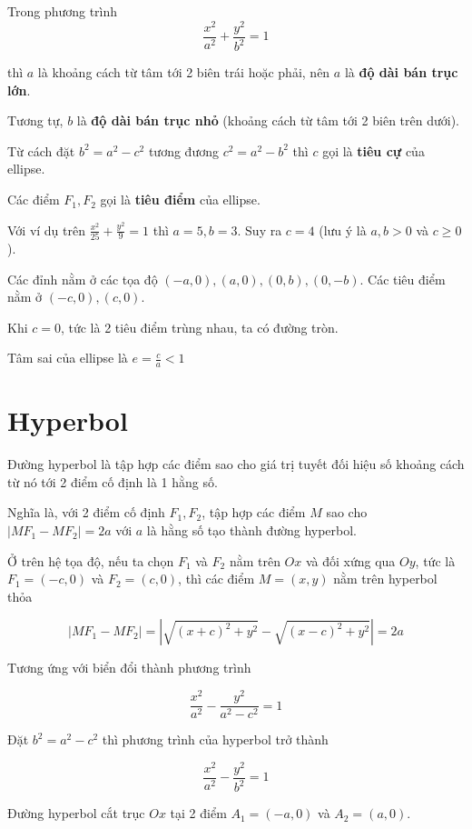 Trong phương trình $$\frac{x^2}{a^2} + \frac{y^2}{b^2} = 1$$

thì $a$ là khoảng cách từ tâm tới 2 biên trái hoặc phải, nên $a$ là \textbf{độ dài bán trục lớn}.

Tương tự, $b$ là \textbf{độ dài bán trục nhỏ} (khoảng cách từ tâm tới 2 biên trên dưới).

Từ cách đặt $b^2 = a^2 - c^2$ tương đương $c^2 = a^2 - b^2$ thì $c$ gọi là \textbf{tiêu cự} của ellipse.

Các điểm $F_1, F_2$ gọi là \textbf{tiêu điểm} của ellipse.

Với ví dụ trên $\frac{x^2}{25} + \frac{y^2}{9} = 1$ thì $a=5, b=3$. Suy ra $c=4$ (lưu ý là $a, b > 0$ và $c \geq 0$).

Các đỉnh nằm ở các tọa độ $(-a, 0), (a, 0), (0, b), (0, -b)$. Các tiêu điểm nằm ở $(-c, 0), (c, 0)$.

\begin{remark}
    Khi $c=0$, tức là 2 tiêu điểm trùng nhau, ta có đường tròn.
\end{remark}

Tâm sai của ellipse là $e = \frac{c}{a} < 1$

\section{Hyperbol}

\begin{definition}[Hyperbol]
    Đường hyperbol là tập hợp các điểm sao cho giá trị tuyết đối hiệu số khoảng cách từ nó tới 2 điểm cố định là 1 hằng số.
\end{definition}

Nghĩa là, với 2 điểm cố định $F_1, F_2$, tập hợp các điểm $M$ sao cho $| M F_1 - M F_2 | = 2a$ với $a$ là hằng số tạo thành đường hyperbol.

Ở trên hệ tọa độ, nếu ta chọn $F_1$ và $F_2$ nằm trên $Ox$ và đối xứng qua $Oy$, tức là $F_1 = (-c, 0)$ và $F_2 = (c, 0)$, thì các điểm $M = (x, y)$ nằm trên hyperbol thỏa

$$| MF_1 - MF_2 | = | \sqrt{(x+c)^2 + y^2} - \sqrt{(x-c)^2 + y^2} | = 2a$$

Tương ứng với biển đổi thành phương trình

$$\frac{x^2}{a^2} - \frac{y^2}{a^2 - c^2} = 1$$

Đặt $b^2 = a^2 - c^2$ thì phương trình của hyperbol trở thành

$$\frac{x^2}{a^2} - \frac{y^2}{b^2} = 1$$

Đường hyperbol cắt trục $Ox$ tại 2 điểm $A_1 = (-a, 0)$ và $A_2 = (a, 0)$.

